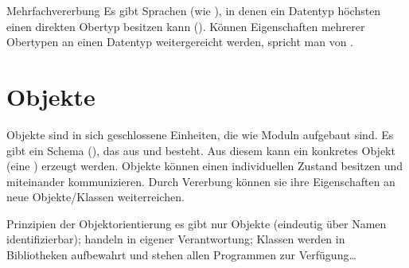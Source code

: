 \begin{Def}{Mehrfachvererbung}
    Es gibt Sprachen (wie \Ada{}), in denen ein Datentyp höchsten einen
    direkten Obertyp besitzen kann ().
    Können Eigenschaften mehrerer Obertypen an einen Datentyp weitergereicht
    werden, spricht man von .
\end{Def}

\section{%
    Objekte%
}

\begin{Def}{Objekte}
     sind in sich geschlossene Einheiten, die wie Moduln
    aufgebaut sind.
    Es gibt ein Schema (), das aus  und
     besteht.
    Aus diesem kann ein konkretes Objekt (eine ) erzeugt
    werden.
    Objekte können einen individuellen Zustand besitzen und miteinander
    kommunizieren.
    Durch Vererbung können sie ihre Eigenschaften an neue Objekte/Klassen
    weiterreichen.
\end{Def}

\begin{Def}{Prinzipien der Objektorientierung}
    es gibt nur Objekte (eindeutig über Namen identifizierbar);
    handeln in eigener Verantwortung;
    Klassen werden in Bibliotheken aufbewahrt und stehen allen
    Programmen zur Verfügung\dots
\end{Def}

\pagebreak
